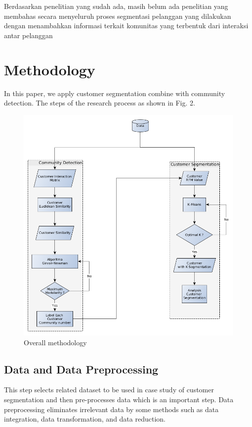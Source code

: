 \documentclass[conference]{IEEEtran}
\begin{document}
Berdasarkan penelitian yang sudah ada, masih belum ada penelitian yang membahas secara menyeluruh proses segmentasi pelanggan yang dilakukan dengan menambahkan informasi terkait komunitas yang terbentuk dari interaksi antar pelanggan

\section{Methodology}
In this paper, we apply customer segmentation combine with community detection. The steps of the research process as shown in Fig. 2.

\begin{figure}[h]
\centering
\includegraphics[width=\columnwidth]{figure/overall_methodology}
\caption{Overall methodology}
\label{overall_methodology}
\end{figure}

\subsection{Data and Data Preprocessing}
This step selects related dataset to be used in case study of customer segmentation and then pre-processes data which is an important step. Data preprocessing eliminates irrelevant data by some methods such as data integration, data transformation, and data reduction.
\end{document}
